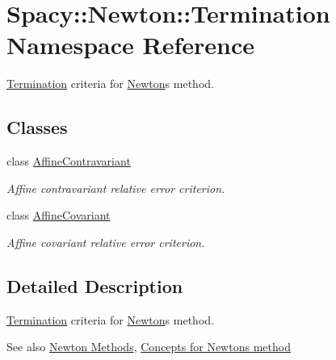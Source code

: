 \hypertarget{namespaceSpacy_1_1Newton_1_1Termination}{}\section{Spacy\+:\+:Newton\+:\+:Termination Namespace Reference}
\label{namespaceSpacy_1_1Newton_1_1Termination}


\hyperlink{namespaceSpacy_1_1Newton_1_1Termination}{Termination} criteria for \hyperlink{namespaceSpacy_1_1Newton}{Newton}\textquotesingle{}s method.  


\subsection*{Classes}
\begin{DoxyCompactItemize}
\item 
class \hyperlink{classSpacy_1_1Newton_1_1Termination_1_1AffineContravariant}{Affine\+Contravariant}
\begin{DoxyCompactList}\small\item\em Affine contravariant relative error criterion. \end{DoxyCompactList}\item 
class \hyperlink{classSpacy_1_1Newton_1_1Termination_1_1AffineCovariant}{Affine\+Covariant}
\begin{DoxyCompactList}\small\item\em Affine covariant relative error criterion. \end{DoxyCompactList}\end{DoxyCompactItemize}


\subsection{Detailed Description}
\hyperlink{namespaceSpacy_1_1Newton_1_1Termination}{Termination} criteria for \hyperlink{namespaceSpacy_1_1Newton}{Newton}\textquotesingle{}s method. 

\begin{DoxySeeAlso}{See also}
\hyperlink{group__NewtonGroup}{Newton Methods}, \hyperlink{group__NewtonConceptGroup}{Concepts for Newton\textquotesingle{}s method} 
\end{DoxySeeAlso}
